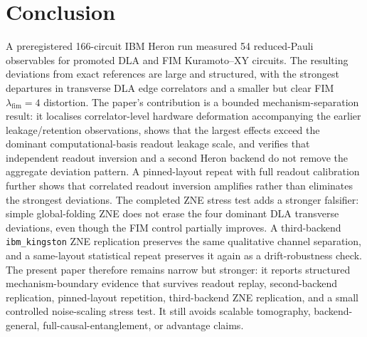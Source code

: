 \documentclass[preprint,aps,physrev,superscriptaddress,floatfix,longbibliography]{revtex4-2}
\begin{document}
\section{Conclusion}

A preregistered 166-circuit IBM Heron run measured 54 reduced-Pauli observables
for promoted DLA and FIM Kuramoto--XY circuits. The resulting deviations from
exact references are large and structured, with the strongest departures in
transverse DLA edge correlators and a smaller but clear FIM
$\lambda_{\mathrm{fim}}=4$ distortion. The paper's contribution is a bounded
mechanism-separation result: it localises correlator-level hardware
deformation accompanying the earlier leakage/retention observations, shows
that the largest effects exceed the dominant computational-basis readout
leakage scale, and verifies that independent readout inversion and a second
Heron backend do not remove the aggregate deviation pattern. A pinned-layout
repeat with full readout calibration further shows that correlated readout
inversion amplifies rather than eliminates the strongest deviations. The
completed ZNE stress test adds a stronger falsifier: simple global-folding ZNE
does not erase the four dominant DLA transverse deviations, even though the FIM
control partially improves. A third-backend \texttt{ibm\_kingston} ZNE
replication preserves the same qualitative channel separation, and a
same-layout statistical repeat preserves it again as a drift-robustness check.
The present paper therefore remains narrow but stronger: it reports structured
mechanism-boundary evidence that survives readout replay, second-backend
replication, pinned-layout repetition, third-backend ZNE replication, and a
small controlled noise-scaling stress test. It still avoids scalable
tomography, backend-general, full-causal-entanglement, or advantage claims.



\end{document}
